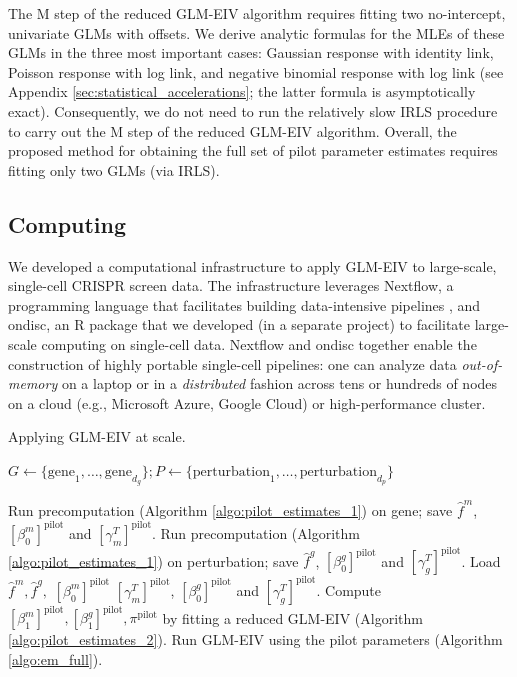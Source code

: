 \documentclass[11pt]{article}
\begin{document}
The M step of the reduced GLM-EIV algorithm requires fitting two no-intercept, univariate GLMs with offsets. We derive analytic formulas for the MLEs of these GLMs in the three most important cases: Gaussian response with identity link, Poisson response with log link, and negative binomial response with log link (see Appendix \ref{sec:statistical_accelerations}; the latter formula is asymptotically exact). Consequently, we do not need to run the relatively slow IRLS procedure to carry out the M step of the reduced GLM-EIV algorithm. Overall, the proposed method for obtaining the full set of pilot parameter estimates requires fitting only two GLMs (via IRLS).

\subsection{Computing}\label{sec:computing}

We developed a computational infrastructure to apply GLM-EIV to large-scale, single-cell CRISPR screen data. The infrastructure leverages Nextflow, a programming language that facilitates building data-intensive pipelines \cite{DITommaso2017}, and ondisc, an R package that we developed (in a separate project) to facilitate large-scale computing on single-cell data. Nextflow and ondisc together enable the construction of highly portable single-cell pipelines: one can analyze data \textit{out-of-memory} on a laptop or in a \textit{distributed} fashion across tens or hundreds of nodes on a cloud (e.g., Microsoft Azure, Google Cloud) or high-performance cluster.

\begin{algorithm}
	\caption{Applying GLM-EIV at scale.}\label{algo:at_scale}
	\begin{algorithmic}
		\State $G \gets \{\textrm{gene}_1, \dots, \textrm{gene}_{d_g}\}; P \gets \{\textrm{perturbation}_1, \dots, \textrm{perturbation}_{d_p}\}$
		
		\State Run precomputation (Algorithm \ref{algo:pilot_estimates_1}) on gene; save $\hat{f}^m$, $[\beta^m_0]^\textrm{pilot}$ and $[\gamma^T_m]^\textrm{pilot}$.
		\EndFor
		\State Run precomputation  (Algorithm \ref{algo:pilot_estimates_1}) on perturbation; save $\hat{f}^g$, $[\beta^g_0]^\textrm{pilot}$ and $[\gamma^T_g]^\textrm{pilot}$.
		\EndFor
		\State Load $\hat{f}^m, \hat{f}^g,$ $[\beta^m_0]^\textrm{pilot}$ $[\gamma^T_m]^\textrm{pilot}$, $[\beta^g_0]^\textrm{pilot}$ and $[\gamma^T_g]^\textrm{pilot}$.
		\State Compute $[\beta^m_1]^\textrm{pilot}, [\beta^g_1]^\textrm{pilot}, \pi^\textrm{pilot}$ by fitting a reduced GLM-EIV (Algorithm \ref{algo:pilot_estimates_2}).
		\State Run GLM-EIV using the pilot parameters (Algorithm \ref{algo:em_full}).
		\EndFor
	\end{algorithmic}
\end{algorithm}
\end{document}

